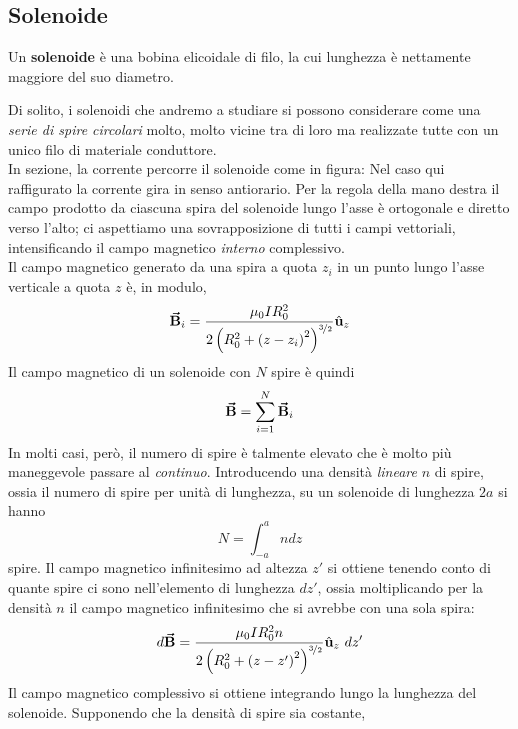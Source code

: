 		\subsection{Solenoide}
		\begin{define}[Solenoide]
			Un \textbf{solenoide} è una bobina elicoidale di filo, la cui lunghezza è nettamente maggiore del suo diametro.
		\end{define}
		Di solito, i solenoidi che andremo a studiare si possono considerare come una \textit{serie di spire circolari} molto, molto vicine tra di loro ma realizzate tutte con un unico filo di materiale conduttore.\\
		In sezione, la corrente percorre il solenoide come in figura:
		Nel caso qui raffigurato la corrente gira in senso antiorario. Per la regola della mano destra il campo prodotto da ciascuna spira del solenoide lungo l'asse è ortogonale e diretto verso l'alto; ci aspettiamo una sovrapposizione di tutti i campi vettoriali, intensificando il campo magnetico \textit{interno} complessivo.\\
		Il campo magnetico generato da una spira a quota $z_i$ in un punto lungo l'asse verticale a quota $z$ è, in modulo,
		\begin{equation*}
			\vb*{\va{B}}_i=\frac{\mu_0 I R_0^2}{2\left(R_0^2+\left(z-z_i\right)^2\right)^{\nicefrac{3}{2}}}\hat{\mathbf{u}}_z
		\end{equation*}
		Il campo magnetico di un solenoide con $N$ spire è quindi
		\begin{equation*}
			\vb*{\va{B}}=\sum_{i=1}^{N}\vb*{\va{B}}_i
		\end{equation*}
		In molti casi, però, il numero di spire è talmente elevato che è molto più maneggevole passare al \textit{continuo}. Introducendo una densità \textit{lineare} $n$ di spire, ossia il numero di spire per unità di lunghezza, su un solenoide di lunghezza $2a$ si hanno
		\begin{equation*}
			N=\int_{-a}^{a}ndz
		\end{equation*}
		spire. Il campo magnetico infinitesimo ad altezza $z'$ si ottiene tenendo conto di quante spire ci sono nell'elemento di lunghezza $dz'$, ossia moltiplicando per la densità $n$ il campo magnetico infinitesimo che si avrebbe con una sola spira:
		\begin{equation*}
			d\vba{B}=\frac{\mu_0 I R_0^2 n}{2\left(R_0^2+\left(z-z'\right)^2\right)^{\nicefrac{3}{2}}}\vbh{u}_z\ dz'
		\end{equation*}
		Il campo magnetico complessivo si ottiene integrando lungo la lunghezza del solenoide. Supponendo che la densità di spire sia costante,
